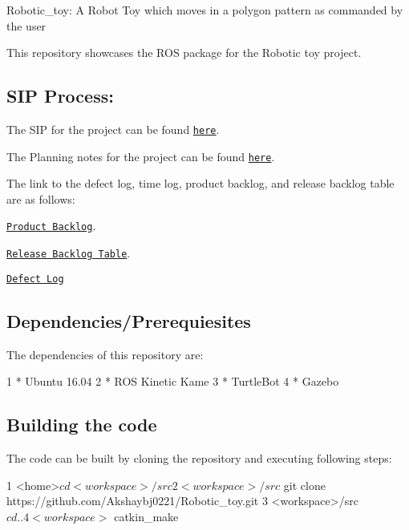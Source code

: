 \href{https://github.com/Akshaybj0221/Robotic_toy/blob/master/LICENSE}{\tt } \href{https://travis-ci.org/Akshaybj0221/Robotic_toy}{\tt }

Robotic\+\_\+toy\+: A Robot Toy which moves in a polygon pattern as commanded by the user

This repository showcases the R\+OS package for the Robotic toy project. 



\subsection*{S\+IP Process\+:}

The S\+IP for the project can be found \href{https://docs.google.com/spreadsheets/d/1jLItNdomgrqtsU7UJ7i3CasUFsOEN9d-EHtjViunuMg/edit?usp=sharing}{\tt here}.

The Planning notes for the project can be found \href{https://docs.google.com/document/d/1cuM1NgHEFEkOeJMYtaNpIpAXfJ_u0YdG9ozSTAGEVLY/edit?usp=sharing}{\tt here}.

The link to the defect log, time log, product backlog, and release backlog table are as follows\+:

\href{https://docs.google.com/spreadsheets/d/1XhrbZjeozz02wAhwiE5d25f-5yS15jGHrX1-cPPEQfs/edit?usp=sharing}{\tt Product Backlog}.

\href{https://docs.google.com/spreadsheets/d/1TbC_kTvKK2MRH9XEX8YbNeR_NHrXO2tIK1uxxjgT04Y/edit?usp=sharing}{\tt Release Backlog Table}.

\href{https://docs.google.com/spreadsheets/d/1sQbnvWU1MZIwgt0YRekxqZq24jqrIhIC-pB-LOpDczo/edit?usp=sharing}{\tt Defect Log}

\subsection*{Dependencies/\+Prerequiesites}

The dependencies of this repository are\+:


\begin{DoxyCode}
1 * Ubuntu 16.04
2 * ROS Kinetic Kame
3 * TurtleBot
4 * Gazebo
\end{DoxyCode}


\subsection*{Building the code}

The code can be built by cloning the repository and executing following steps\+: 
\begin{DoxyCode}
1 <home>$ cd <workspace>/src
2 <workspace>/src$ git clone https://github.com/Akshaybj0221/Robotic\_toy.git
3 <workspace>/src$ cd ..
4 <workspace>$ catkin\_make 
\end{DoxyCode}


